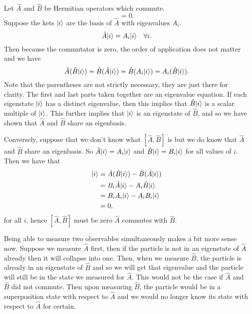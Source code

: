 \documentclass[../quantum_mechanics.tex]{subfiles}
\begin{document}
        Let $\hat{A}$ and $\hat{B}$ be Hermitian operators which commute.
        \begin{equation}
            [\hat{A},\hat{B}]=0.
        \end{equation}
        Suppose the kets $\lvert i\rangle$ are the basis of $\hat{A}$ with eigenvalues $A_i$.
        \begin{equation}
            \hat{A}\lvert i\rangle=A_i\lvert i\rangle\quad\forall i.
        \end{equation}
        Then because the commutator is zero, the order of application does not matter and we have
        \begin{equation}
            \hat{A}(\hat{B}\lvert i\rangle)=\hat{B}(\hat{A}\lvert i\rangle)=\hat{B}(A_i\lvert i\rangle)=A_i(\hat{B}\lvert i\rangle).
        \end{equation}
        Note that the parentheses are not strictly necessary, they are just there for clarity.
        The first and last parts taken together are an eigenvalue equation.
        If each eigenstate $\lvert i\rangle$ has a distinct eigenvalue, then this implies that $\hat{B}\lvert i\rangle$ is a scalar multiple of $\lvert i\rangle$.
        This further implies that $\lvert i\rangle$ is an eigenstate of $\hat{B}$, and so we have shown that $\hat{A}$ and $\hat{B}$ share an eigenbasis.
        
        Conversely, suppose that we don't know what $[\hat{A},\hat{B}]$ is but we do know that $\hat{A}$ and $\hat{B}$ share an eigenbasis.
        So $\hat{A}\lvert i\rangle=A_i\lvert i\rangle$ and $\hat{B}\lvert i\rangle=B_i\lvert i\rangle$ for all values of $i$.
        Then we have that
        \begin{align}
            [\hat{A},\hat{B}]\ket{i}&=\hat{A}(\hat{B}\ket{i})-\hat{B}(\hat{A}\ket{i})\\
            &=B_i\hat{A}\ket{i}-A_i\hat{B}\ket{i}\\
            &=B_iA_i\ket{i}-A_iB_i\ket{i}\\
            &=0,
        \end{align}
        for all $i$, hence $[\hat{A},\hat{B}]$ must be zero $\hat{A}$ commutes with $\hat{B}$.
        
        Being able to measure two observables simultaneously makes a bit more sense now.
        Suppose we measure $\hat{A}$ first, then if the particle is not in an eigenstate of $\hat{A}$ already then it will collapse into one.
        Then, when we measure $\hat{B}$, the particle is already in an eigenstate of $\hat{B}$ and so we will get that eigenvalue and the particle will still be in the state we measured for $\hat{A}$.
        This would not be the case if $\hat{A}$ and $\hat{B}$ did not commute.
        Then upon measuring $\hat{B}$, the particle would be in a superposition state with respect to $\hat{A}$ and we would no longer know its state with respect to $\hat{A}$ for certain.
        
\end{document}
